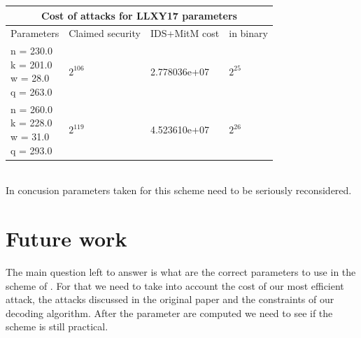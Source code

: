 \documentclass[12pt]{article}
\begin{document}
\begin{tabular}{ |l||p{}|p{}|p{}| }
 \hline
 \multicolumn{4}{|c|}{Cost of attacks for LLXY17 parameters } \\
 \hline
 Parameters & Claimed security & IDS+MitM cost & in binary \\
 \hline
 \makecell{n = 230.0 \\ k = 201.0 \\ w = 28.0 \\ q = 263.0} & $2^{106}$ & 2.778036e+07 & $2^{25}$ \\
 \hline
 \makecell{n = 260.0 \\ k = 228.0 \\ w = 31.0 \\ q = 293.0} & $2^{119}$ & 4.523610e+07 & $2^{26}$ \\
 \hline
\end{tabular}
\\

In concusion parameters taken for this scheme need to be seriously reconsidered.

\section{Future work}

The main question left to answer is what are the correct parameters to use in the scheme of \cite{[LLXY17]}. For that we need to take into account the cost of our most efficient attack, the attacks discussed in the original paper and the constraints of our decoding algorithm. After the parameter are computed we need to see if the scheme is still practical.


\appendix
\end{document}
